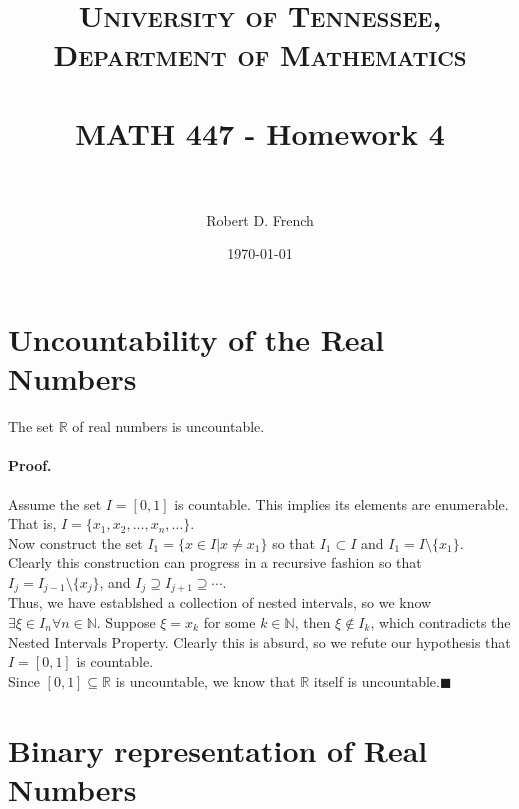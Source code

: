 \documentclass[paper=a4, fontsize=11pt]{scrartcl} %
\title{	
\normalfont \normalsize 
\textsc{University of Tennessee, Department of Mathematics} \\ [25pt] %
\horrule{0.5pt} \\[0.4cm] %
\huge MATH 447 - Homework 4 \\ %
\horrule{2pt} \\[0.5cm] %
}
\author{Robert D. French} %
\date{\normalsize\today} %
\numberwithin{equation}{section} %
\numberwithin{figure}{section} %
\numberwithin{table}{section} %
\begin{document}
\maketitle %


\section{Uncountability of the Real Numbers}

The set $\mathbb{R}$ of real numbers is uncountable.

\paragraph{Proof.}

Assume the set $I=[0,1]$ is countable. This implies its elements are enumerable. That is, $I=\{x_1,x_2,\ldots,x_n,\ldots\}$.\\

Now construct the set $I_1=\{x \in I | x \neq x_1\}$ so that $I_1 \subset I$ and $ I_1 = I \setminus \{x_1\}$. Clearly this construction can progress in a recursive fashion so that $I_j = I_{j-1} \setminus \{x_j\}$, and $I_j \supseteq I_{j+1} \supseteq \cdots$.\\

Thus, we have establshed a collection of nested intervals, so we know $\exists \xi \in I_n \forall n \in \mathbb{N}$. Suppose $\xi = x_k$ for some $k \in \mathbb{N}$, then $\xi \notin I_k$, which contradicts the Nested Intervals Property. Clearly this is absurd, so we refute our hypothesis that $I=[0,1]$ is countable.\\

Since $[0,1] \subseteq \mathbb{R}$ is uncountable, we know that $\mathbb{R}$ itself is uncountable.$\blacksquare$


\section{Binary representation of Real Numbers}
\end{document}
